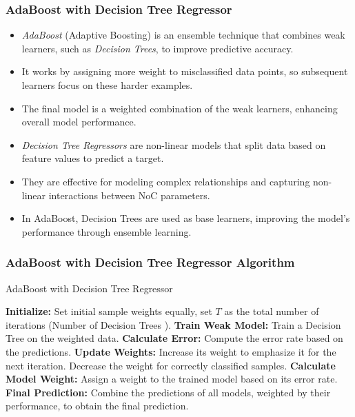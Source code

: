 \documentclass{beamer}
\begin{document}
\begin{frame}
\frametitle{AdaBoost with Decision Tree Regressor}

\begin{itemize}
    \item \textit{AdaBoost} (Adaptive Boosting) is an ensemble technique that combines weak learners, such as \textit{Decision Trees}, to improve predictive accuracy.
    \item It works by assigning more weight to misclassified data points, so subsequent learners focus on these harder examples.
    \item The final model is a weighted combination of the weak learners, enhancing overall model performance.
    \item \textit{Decision Tree Regressors} are non-linear models that split data based on feature values to predict a target.
    \item They are effective for modeling complex relationships and capturing non-linear interactions between NoC parameters.
    \item In AdaBoost, Decision Trees are used as base learners, improving the model's performance through ensemble learning.
\end{itemize}
\end{frame}

\begin{frame}
\frametitle{AdaBoost with Decision Tree Regressor Algorithm}

\begin{algorithm}[H]
\caption{AdaBoost with Decision Tree Regressor}
\begin{algorithmic}[1]
\State \textbf{Initialize:} Set initial sample weights equally, set $T$ as the total number of iterations (Number of Decision Trees ).
    \State \textbf{Train Weak Model:} Train a Decision Tree on the weighted data.
    \State \textbf{Calculate Error:} Compute the error rate based on the predictions.
    \State \textbf{Update Weights:} 
        \State Increase its weight to emphasize it for the next iteration.
    \Else
        \State Decrease the weight for correctly classified samples.
    \EndIf
    \State \textbf{Calculate Model Weight:} Assign a weight to the trained model based on its error rate.
\EndFor
\State \textbf{Final Prediction:} Combine the predictions of all models, weighted by their performance, to obtain the final prediction.
\end{algorithmic}
\end{algorithm}

\end{frame}
\end{document}
